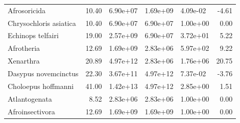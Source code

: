 \documentclass[]{elsarticle} %
\begin{document}
\begin{table}
{\begin{tabular}[t]{lrlllr}
Afrosoricida & 10.40 & 6.90e+07 & 1.69e+09 & 4.09e-02 & -4.61\\
Chrysochloris asiatica & 10.40 & 6.90e+07 & 6.90e+07 & 1.00e+00 & 0.00\\
Echinops telfairi & 19.00 & 2.57e+09 & 6.90e+07 & 3.72e+01 & 5.22\\
Afrotheria & 12.69 & 1.69e+09 & 2.83e+06 & 5.97e+02 & 9.22\\
Xenarthra & 20.89 & 4.97e+12 & 2.83e+06 & 1.76e+06 & 20.75\\
\addlinespace
Dasypus novemcinctus & 22.30 & 3.67e+11 & 4.97e+12 & 7.37e-02 & -3.76\\
Choloepus hoffmanni & 41.00 & 1.42e+13 & 4.97e+12 & 2.85e+00 & 1.51\\
Atlantogenata & 8.52 & 2.83e+06 & 2.83e+06 & 1.00e+00 & 0.00\\
Afroinsectivora & 12.69 & 1.69e+09 & 1.69e+09 & 1.00e+00 & 0.00\\
\bottomrule
\end{tabular}}
\end{table}
\end{document}
